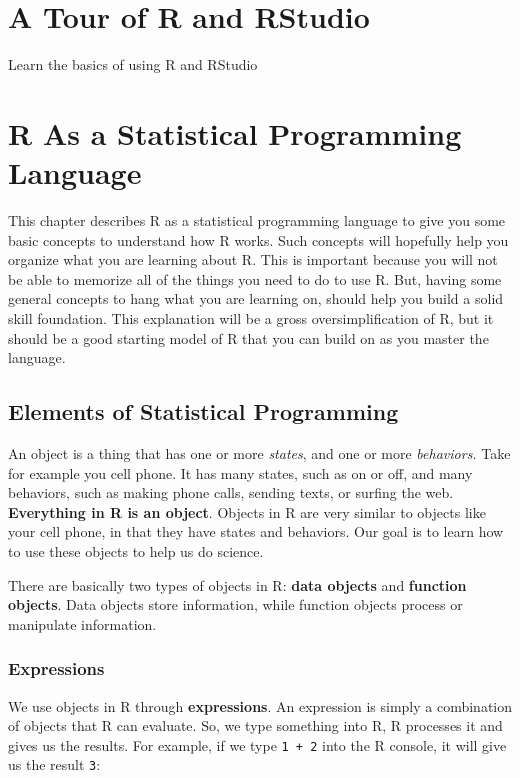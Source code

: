\documentclass[
]{book}
\begin{document}
\hypertarget{tour}{%
\chapter{A Tour of R and RStudio}\label{tour}}

Learn the basics of using R and RStudio

\hypertarget{raspl}{%
\chapter{R As a Statistical Programming Language}\label{raspl}}

This chapter describes R as a statistical programming language to give you some basic concepts to understand how R works.
Such concepts will hopefully help you organize what you are learning about R.
This is important because you will not be able to memorize all of the things you need to do to use R.
But, having some general concepts to hang what you are learning on, should help you build a solid skill foundation.
This explanation will be a gross oversimplification of R, but it should be a good starting model of R that you can build on as you master the language.

\hypertarget{elements-of-statistical-programming}{%
\section{Elements of Statistical Programming}\label{elements-of-statistical-programming}}

An object is a thing that has one or more \emph{states}, and one or more \emph{behaviors.}
Take for example you cell phone.
It has many states, such as on or off, and many behaviors, such as making phone calls, sending texts, or surfing the web.
\textbf{Everything in R is an object}.
Objects in R are very similar to objects like your cell phone, in that they have states and behaviors.
Our goal is to learn how to use these objects to help us do science.

There are basically two types of objects in R: \textbf{data objects} and \textbf{function objects}.
Data objects store information, while function objects process or manipulate information.

\hypertarget{expressions}{%
\subsection{Expressions}\label{expressions}}

We use objects in R through \textbf{expressions}.
An expression is simply a combination of objects that R can evaluate.
So, we type something into R, R processes it and gives us the results.
For example, if we type \texttt{1\ +\ 2} into the R console, it will give us the result \texttt{3}:
\end{document}
